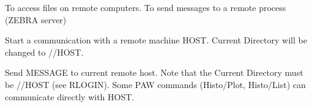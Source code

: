 \BEGTEXT
To access files on remote computers.
To send messages to a remote process (ZEBRA server)
\ENDTEXT

\BEGARG
{}
\ENDARG
\BEGTEXT
Start a communication with a remote machine HOST.
Current Directory will be changed to //HOST.
\ENDTEXT

\BEGARG
{}
\ENDARG
\BEGTEXT
Send MESSAGE to current remote host.
Note that the Current Directory must be //HOST (see RLOGIN).
Some PAW commands (Histo/Plot, Histo/List) can communicate
directly with HOST.
\ENDTEXT


